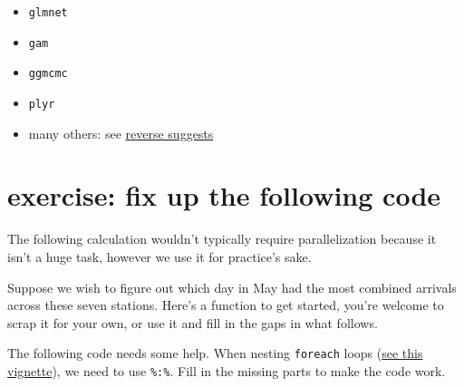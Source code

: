 \documentclass[]{article}
\newenvironment{Shaded}{\begin{snugshade}}{\end{snugshade}}
\newcommand{\KeywordTok}[1]{\textcolor[rgb]{0.13,0.29,0.53}{\textbf{{#1}}}}
\newcommand{\DataTypeTok}[1]{\textcolor[rgb]{0.13,0.29,0.53}{{#1}}}
\newcommand{\StringTok}[1]{\textcolor[rgb]{0.31,0.60,0.02}{{#1}}}
\newcommand{\OtherTok}[1]{\textcolor[rgb]{0.56,0.35,0.01}{{#1}}}
\newcommand{\NormalTok}[1]{{#1}}
\begin{document}
\begin{itemize}
\itemsep1pt\parskip0pt
\item
  \texttt{glmnet}
\item
  \texttt{gam}
\item
  \texttt{ggmcmc}
\item
  \texttt{plyr}
\item
  many others: see
  \href{http://cran.r-project.org/web/packages/foreach/index.html}{reverse
  suggests}
\end{itemize}

\section{{exercise}: fix up the following
code}\label{exercise-fix-up-the-following-code}

The following calculation wouldn't typically require parallelization
because it isn't a huge task, however we use it for practice's sake.

Suppose we wish to figure out which day in May had the most combined
arrivals across these seven stations. Here's a function to get started,
you're welcome to scrap it for your own, or use it and fill in the gaps
in what follows.

\begin{Shaded}
\end{Shaded}

The following code needs some help. When nesting \texttt{foreach} loops
(\href{http://cran.r-project.org/web/packages/foreach/vignettes/nested.pdf}{see
this vignette}), we need to use \texttt{\%:\%}. Fill in the missing
parts to make the code work.
\end{document}

